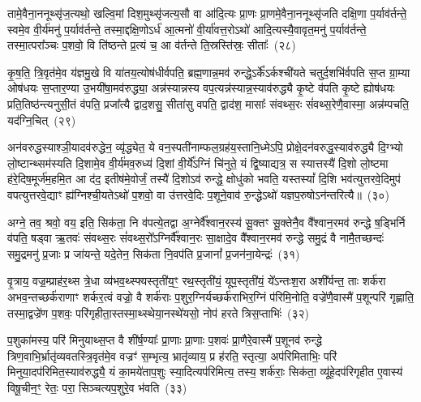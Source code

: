 तामे॒वैना॒ननूथ्सृ॑ज॒त्यथो॒ खल्वि॒मां दिश॒मुथ्सृ॑जत्य॒सौ वा आ॑दि॒त्यः प्रा॒णः प्रा॒णमे॒वैना॒ननूथ्सृ॑जति दक्षि॒णा प॒र्याव॑र्तन्ते॒ स्वमे॒व वी॒र्य॑मनु॑ प॒र्याव॑र्तन्ते॒ तस्मा॒द्दक्षि॒णो\-ऽर्ध॑ आ॒त्मनो॑ वी॒र्या॑वत्त॒रो\-ऽथो॑ आदि॒त्यस्यै॒वावृत॒मनु॑ प॒र्याव॑र्तन्ते॒ तस्मा॒त्परा᳚ञ्चः प॒शवो॒ वि ति॑ष्ठन्ते प्र॒त्यं च॒ आ व॑र्तन्ते ति॒स्रस्ति॑स्रः॒ सीताः᳚~(२८)

कृ॒ष॒ति॒ त्रि॒वृत॑मे॒व य॑ज्ञमु॒खे वि या॑तय॒त्योष॑धीर्वपति॒ ब्रह्म॒णान्न॒मव॑ रुन्द्धे॒\-ऽर्के᳚\-ऽर्कश्ची॑यते चतुर्द॒शभि॑र्वपति स॒प्त ग्रा॒म्या ओष॑धयः स॒प्तार॒ण्या उ॒भयी॑षा॒मव॑रुद्ध्या॒ अन्न॑स्यान्नस्य वप॒त्यन्न॑स्यान्न॒स्याव॑रुद्ध्यै कृ॒ष्टे व॑पति कृ॒ष्टे ह्योष॑धयः प्रति॒तिष्ठ॑न्त्यनुसी॒तं व॑पति॒ प्रजा᳚त्यै द्वाद॒शसु॒ सीता॑सु वपति॒ द्वाद॑श॒ मासाः᳚ संवथ्स॒रः सं॑वथ्स॒रेणै॒वास्मा॒ अन्न॑म्पचति॒ यद॑ग्नि॒चित्~(२९)

अन॑वरुद्धस्याश्ञी॒यादव॑रुद्धेन॒ व्यृ॑द्ध्येत॒ ये वन॒स्पती॑नाम्फल॒ग्रह॑य॒स्तानि॒ध्मे\-ऽपि॒ प्रोक्षे॒दन॑वरुद्ध॒स्याव॑रुद्ध्यै दि॒ग्भ्यो लो॒ष्टान्थ्सम॑स्यति दि॒शामे॒व वी॒र्य॑मव॒रुध्य॑ दि॒शां वी॒र्ये᳚\-ऽग्निं चि॑नुते॒ यं द्वि॒ष्याद्यत्र॒ स स्यात्तस्यै॑ दि॒शो लो॒ष्टमा ह॑रे॒दिष॒मूर्ज॑म॒हमि॒त आ द॑द॒ इतीष॑मे॒वोर्जं॒ तस्यै॑ दि॒शो\-ऽव॑ रुन्द्धे॒ क्षोधु॑को भवति॒ यस्तस्यां᳚ दि॒शि भव॑त्युत्तरवे॒दिमुप॑ वपत्युत्तरवे॒द्याꣳ ह्य॑ग्निश्ची॒यते\-ऽथो॑ प॒शवो॒ वा उ॑त्तरवे॒दिः प॒शूने॒वाव॑ रु॒न्द्धे\-ऽथो॑ यज्ञप॒रुषो\-ऽन॑न्तरित्यै॥~(३०)

{\anuvakamend[{च॒ भ॒व॒त्ये॒ताव॒द्वै पुरु॑षे वी॒र्यं॑ यत्कृ॒ष्टञ्चाकृ॑ष्टं च॒ दिख्सीता॑ अग्नि॒चिदव॒ पञ्च॑विꣳशतिश्च}]}%

अग्ने॒ तव॒ श्रवो॒ वय॒ इति॒ सिक॑ता॒ नि व॑पत्ये॒तद्वा अ॒ग्नेर्वै᳚श्वान॒रस्य॑ सू॒क्तꣳ सू॒क्तेनै॒व वै᳚श्वान॒रमव॑ रुन्द्धे ष॒ड्भिर्नि व॑पति॒ षड्वा ऋ॒तवः॑ संवथ्स॒रः सं॑वथ्स॒रो᳚\-ऽग्निर्वै᳚श्वान॒रः सा॒क्षादे॒व वै᳚श्वान॒रमव॑ रुन्द्धे समु॒द्रं वै नामै॒तच्छन्दः॑ समु॒द्रमनु॑ प्र॒जाः प्र जा॑यन्ते॒ यदे॒तेन॒ सिक॑ता नि॒वप॑ति प्र॒जानां᳚ प्र॒जन॑ना॒येन्द्रः॑~(३१)

वृ॒त्राय॒ वज्र॒म्प्राह॑र॒थ्स त्रे॒धा व्य॑भव॒थ्स्फ्यस्तृती॑य॒ꣳ॒ रथ॒स्तृती॑यं॒ यूप॒स्तृती॑यं॒ ये᳚\-ऽन्तःश॒रा अशी᳚र्यन्त॒ ताः शर्क॑रा अभव॒न्तच्छर्क॑राणाꣳ शर्कर॒त्वं वज्रो॒ वै शर्क॑राः प॒शुर॒ग्निर्यच्छर्क॑राभिर॒ग्निं प॑रिमि॒नोति॒ वज्रे॑णै॒वास्मै॑ प॒शून्परि॑ गृह्णाति॒ तस्मा॒द्वज्रे॑ण प॒शवः॒ परि॑गृहीता॒स्तस्मा॒थ्स्थेया॒नस्थे॑यसो॒ नोप॑ हरते त्रिस॒प्ताभिः॑~(३२)

प॒शुका॑मस्य॒ परि॑ मिनुयाथ्स॒प्त वै शी॑र्\mbox{}ष॒ण्याः᳚ प्रा॒णाः प्रा॒णाः प॒शवः॑ प्रा॒णैरे॒वास्मै॑ प॒शूनव॑ रुन्द्धे त्रिण॒वाभि॒\-र्भ्रातृ॑व्यवतस्त्रि॒वृत॑मे॒व वज्रꣳ॑ स॒म्भृत्य॒ भ्रातृ॑व्याय॒ प्र ह॑रति॒ स्तृत्या॒ अप॑रिमिताभिः॒ परि॑ मिनुया॒दप॑रिमित॒स्याव॑रुद्ध्यै॒ यं का॒मये॑ताप॒शुः स्या॒दित्यप॑रिमित्य॒ तस्य॒ शर्क॑राः॒ सिक॑ता॒ व्यू॑हे॒दप॑रिगृहीत ए॒वास्य॑ विषू॒चीन॒ꣳ॒ रेतः॒ परा॒ सिञ्चत्यप॒शुरे॒व भ॑वति~(३३)

